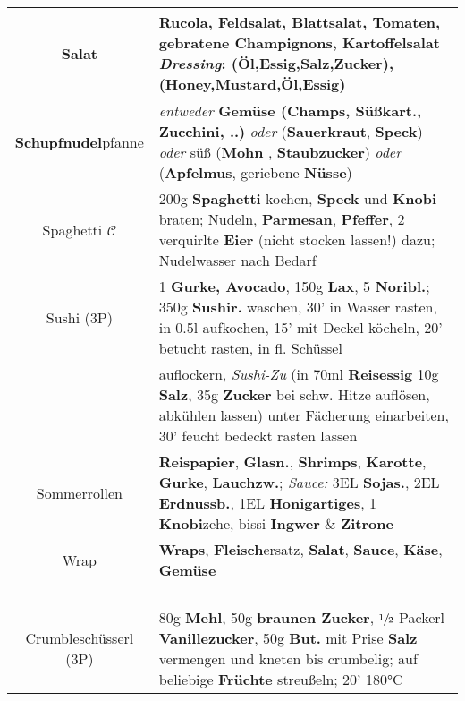 \documentclass{article}
\begin{document}
\begin{tabular}{c|l}
		Salat&\textbf{Rucola}, \textbf{Feldsalat}, \textbf{Blattsalat}, \textbf{Tomaten}, gebratene \textbf{Champignons}, \textbf{Kartoffelsalat} \quad\textit{Dressing}: (\textbf{Öl,Essig,Salz,Zucker}), (\textbf{Honey,Mustard,Öl,Essig})\\\hline
		
        \textbf{Schupfnudel}pfanne & \textit{entweder} \textbf{Gemüse (Champs, Süßkart., Zucchini, ..)} \quad\textit{oder} (\textbf{Sauerkraut}, \textbf{Speck}) \quad\textit{oder} süß (\textbf{Mohn} , \textbf{Staubzucker}) \textit{oder} (\textbf{Apfelmus}, geriebene \textbf{Nüsse})\\\hline

        Spaghetti $\mathcal{C}$& 200g \textbf{Spaghetti} kochen, \textbf{Speck} und \textbf{Knobi} braten; Nudeln, \textbf{Parmesan}, \textbf{Pfeffer}, 2 verquirlte \textbf{Eier} (nicht stocken lassen!) dazu; Nudelwasser nach Bedarf\\\hline

        Sushi {\scriptsize(3P)} & 1 \textbf{Gurke, Avocado}, 150g \textbf{Lax}, 5 \textbf{Noribl.}; 350g \textbf{Sushir.} waschen, 30' in Wasser rasten, in 0.5l aufkochen, 15' mit Deckel köcheln, 20' betucht rasten, in fl. Schüssel\\&
        auflockern, \textit{Sushi-Zu} (in 70ml \textbf{Reisessig} 10g \textbf{Salz}, 35g \textbf{Zucker} bei schw. Hitze auflösen, abkühlen lassen) unter Fächerung einarbeiten, 30' feucht bedeckt rasten lassen\\\hline

        Sommerrollen & \textbf{Reispapier}, \textbf{Glasn.}, \textbf{Shrimps}, \textbf{Karotte}, \textbf{Gurke}, \textbf{Lauchzw.}; \textit{Sauce:} 3EL \textbf{Sojas.}, 2EL \textbf{Erdnussb.}, 1EL \textbf{Honigartiges}, 1 \textbf{Knobi}zehe, bissi \textbf{Ingwer} \& \textbf{Zitrone} \\\hline

        Wrap & \textbf{Wraps}, \textbf{Fleisch}ersatz, \textbf{Salat}, \textbf{Sauce}, \textbf{Käse}, \textbf{Gemüse}  \\\hline

        \\\hline
        \\\hline
        \\\hline
        \\\hline\hline
        Crumbleschüsserl {\scriptsize(3P)}& 80g \textbf{Mehl}, 50g \textbf{braunen Zucker}, $\sfrac{1}{2}$ Packerl \textbf{Vanillezucker}, 50g \textbf{But.} mit Prise \textbf{Salz} vermengen und kneten bis crumbelig; auf beliebige \textbf{Früchte} streußeln; 20' 180°C
        \\\hline


\end{tabular}
\end{document}
